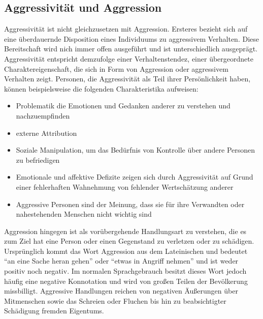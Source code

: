 \subsection{Aggressivität und Aggression}    \label{subsec_2.1.1}

Aggressivität ist nicht gleichzusetzen mit Aggression. Ersteres bezieht sich auf eine 
überdauernde Disposition eines Individuums zu aggressivem Verhalten. Diese Bereitschaft wird 
nich immer offen ausgeführt und ist unterschiedlich ausgeprägt. %
Aggressivität entspricht demzufolge einer Verhaltenstendez, einer übergeordnete 
Charaktereigenschaft, die sich in Form von Aggression oder aggressivem Verhalten zeigt.
Personen, die Aggressivität als Teil ihrer Persönlichkeit haben, können beispielsweise die  
folgenden Charakteristika aufweisen:
\begin{itemize} [leftmargin=1.25cm]
      \item Problematik die Emotionen und Gedanken anderer zu verstehen und nachzuempfinden
      \item externe Attribution
      \item Soziale Manipulation, um das Bedürfnis von Kontrolle über andere 
            Personen zu befriedigen
      \item Emotionale und affektive Defizite zeigen sich durch Aggressivität auf Grund 
            einer fehlerhaften Wahnehmung von fehlender Wertschätzung anderer
      \item Aggressive Personen sind der Meinung, dass sie für ihre Verwandten oder nahestehenden
            Menschen nicht wichtig sind
\end{itemize}

Aggression hingegen ist als vorübergehende Handlungsart zu verstehen, die es zum Ziel hat eine 
Person oder einen Gegenstand zu verletzen oder zu schädigen. %
Ursprünglich kommt das Wort Aggression aus dem Lateinischen und bedeutet 
\enquote{an eine Sache heran gehen} oder \enquote{etwas in Angriff nehmen}%
 und ist weder positiv noch negativ. Im normalen Sprachgebrauch besitzt dieses Wort jedoch 
häufig eine negative Konnotation und wird von großen Teilen der Bevölkerung missbilligt. 
Aggressive Handlungen reichen von negativen Äußerungen über Mitmenschen sowie das Schreien oder 
Fluchen bis hin zu beabsichtigter Schädigung fremden Eigentums. 

